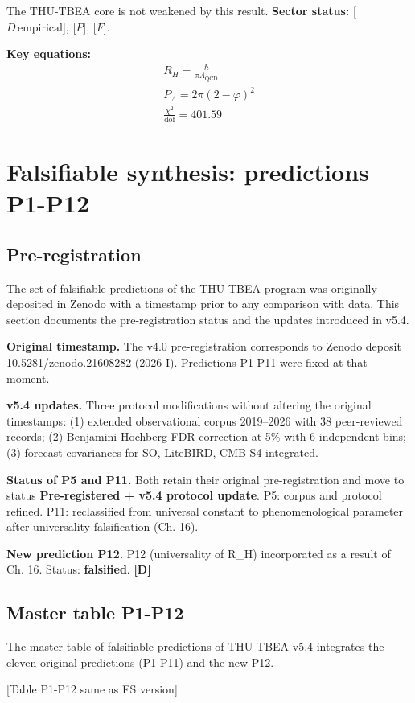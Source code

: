 ﻿\documentclass[11pt,letterpaper]{article}
\begin{document}
The THU-TBEA core is not weakened by this result. \textbf{Sector status:} [$D\,\text{empirical}$], [$P$], [$F$].

\textbf{Key equations:}
\begin{align*}
    R_H = \frac{\hbar}{\pi \Lambda_{\text{QCD}}} \\
    P_\Lambda = 2\pi(2-\varphi)^2 \\
    \frac{\chi^2}{\mathrm{dof}} = 401.59
\end{align*}
\section{Falsifiable synthesis: predictions P1-P12}
\subsection{Pre-registration}
The set of falsifiable predictions of the THU-TBEA program was originally deposited in Zenodo with a timestamp prior to any comparison with data. This section documents the pre-registration status and the updates introduced in v5.4.

\textbf{Original timestamp.} The v4.0 pre-registration corresponds to Zenodo deposit 10.5281/zenodo.21608282 (2026-I). Predictions P1-P11 were fixed at that moment.

\textbf{v5.4 updates.} Three protocol modifications without altering the original timestamps: (1) extended observational corpus 2019--2026 with 38 peer-reviewed records; (2) Benjamini-Hochberg FDR correction at 5\% with 6 independent bins; (3) forecast covariances for SO, LiteBIRD, CMB-S4 integrated.

\textbf{Status of P5 and P11.} Both retain their original pre-registration and move to status \textbf{Pre-registered + v5.4 protocol update}. P5: corpus and protocol refined. P11: reclassified from universal constant to phenomenological parameter after universality falsification (Ch. 16).

\textbf{New prediction P12.} P12 (universality of R\_H) incorporated as a result of Ch. 16. Status: \textbf{falsified}. \textbf{[D]}
\subsection{Master table P1-P12}
The master table of falsifiable predictions of THU-TBEA v5.4 integrates the eleven original predictions (P1-P11) and the new P12.

[Table P1-P12 same as ES version]
\end{document}
